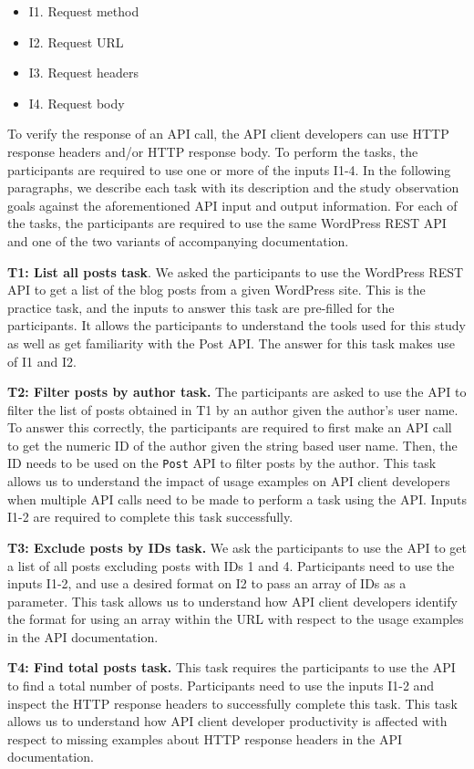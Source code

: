 \documentclass[conference]{IEEEtran}
\begin{document}
\begin{itemize}
  \item I1. Request method
  \item I2. Request URL
  \item I3. Request headers
  \item I4. Request body
\end{itemize}

To verify the response of an API call, the API client developers can use HTTP response headers and/or HTTP response body. To perform the tasks, the participants are required to use one or more of the inputs I1-4. In the following paragraphs, we describe each task with its description and the study observation goals against the aforementioned API input and output information. For each of the tasks, the participants are required to use the same WordPress REST API and one of the two variants of accompanying documentation.

\textbf{T1: List all posts task}. We asked the participants to use the WordPress REST API to get a list of the blog posts from a given WordPress site. This is the practice task, and the inputs to answer this task are pre-filled for the participants. It allows the participants to understand the tools used for this study as well as get familiarity with the Post API. The answer for this task makes use of I1 and I2.

\textbf{T2: Filter posts by author task.} The participants are asked to use the API to filter the list of posts obtained in T1 by an author given the author's user name. To answer this correctly, the participants are required to first make an API call to get the numeric ID of the author given the string based user name. Then, the ID needs to be used on the \lstinline{Post} API to filter posts by the author. This task allows us to understand the impact of usage examples on API client developers when multiple API calls need to be made to perform a task using the API. Inputs I1-2 are required to complete this task successfully.

\textbf{T3: Exclude posts by IDs task.} We ask the participants to use the API to get a list of all posts excluding posts with IDs 1 and 4. Participants need to use the inputs I1-2, and use a desired format on I2 to pass an array of IDs as a parameter. This task allows us to understand how API client developers identify the format for using an array within the URL with respect to the usage examples in the API documentation.

\textbf{T4: Find total posts task.} This task requires the participants to use the API to find a total number of posts. Participants need to use the inputs I1-2 and inspect the HTTP response headers to successfully complete this task. This task allows us to understand how API client developer productivity is affected with respect to missing examples about HTTP response headers in the API documentation.
\end{document}
